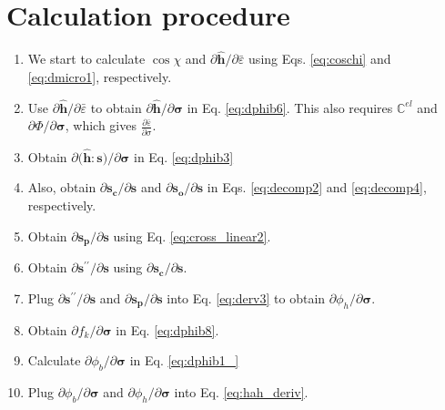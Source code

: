 \documentclass[12pt]{amsart}
\begin{document}
\section{Calculation procedure}
\label{sec:prc}
\begin{enumerate}[1)]
\item We start to calculate $\cos\chi$ and $\partial \hat{\mathbf{h}}/\partial \bar{\varepsilon}$ using Eqs. \ref{eq:coschi} and \ref{eq:dmicro1}, respectively.
\item Use $\partial \hat{\mathbf{h}}/\partial \bar{\varepsilon}$ to obtain $\partial \hat{\mathbf{h}}/\partial \mathbf{\sigma}$ in Eq. \ref{eq:dphib6}. This also requires $\mathbb{C}^{el}$ and $\partial\Phi/\partial\mathbf{\sigma}$, which gives $\frac{\partial\bar{\varepsilon}}{\partial\sigma}$.
\item Obtain $\partial\big(\hat{\mathbf{h}}:\mathbf{s}\big)/\partial \mathbf{\sigma}$ in Eq. \ref{eq:dphib3}
\item Also, obtain $\partial \mathbf{s_c}/\partial \mathbf{s}$ and $\partial \mathbf{s_o}/\partial\mathbf{s}$ in Eqs. \ref{eq:decomp2} and \ref{eq:decomp4}, respectively.
\item Obtain $\partial \mathbf{s_p}/\partial\mathbf{s}$ using Eq. \ref{eq:cross_linear2}.
\item Obtain $\partial\mathbf{s}^{\prime\prime}/\partial\mathbf{s}$ using $\partial \mathbf{s_c}/\partial \mathbf{s}$.
\item Plug $\partial\mathbf{s}^{\prime\prime}/\partial\mathbf{s}$ and  $\partial \mathbf{s_p}/\partial\mathbf{s}$ into Eq. \ref{eq:derv3} to obtain $\partial\phi_h/\partial\mathbf{\sigma}$.
\item Obtain $\partial f_k/\partial \mathbf{\sigma}$ in Eq. \ref{eq:dphib8}.
\item Calculate $\partial \phi_b/\partial \mathbf{\sigma}$ in Eq. \ref{eq:dphib1_}
\item Plug $\partial \phi_b/\partial\mathbf{\sigma}$ and $\partial\phi_h/\partial\mathbf{\sigma}$ into Eq. \ref{eq:hah_deriv}.
\end{enumerate}





\newpage


\end{document}

